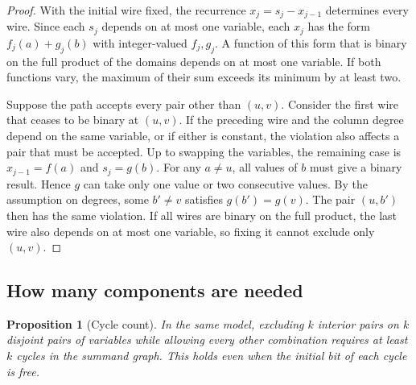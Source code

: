 \documentclass[11pt,a4paper]{article}
\numberwithin{equation}{section}
\newtheorem{proposition}[lemma]{Proposition}
\begin{document}
\begin{proof}
With the initial wire fixed, the recurrence \(x_j=s_j-x_{j-1}\) determines every wire. Since each \(s_j\) depends on at most one variable, each \(x_j\) has the form \(f_j(a)+g_j(b)\) with integer-valued \(f_j,g_j\). A function of this form that is binary on the full product of the domains depends on at most one variable. If both functions vary, the maximum of their sum exceeds its minimum by at least two.

Suppose the path accepts every pair other than \((u,v)\). Consider the first wire that ceases to be binary at \((u,v)\). If the preceding wire and the column degree depend on the same variable, or if either is constant, the violation also affects a pair that must be accepted. Up to swapping the variables, the remaining case is \(x_{j-1}=f(a)\) and \(s_j=g(b)\). For any \(a\ne u\), all values of \(b\) must give a binary result. Hence \(g\) can take only one value or two consecutive values. By the assumption on degrees, some \(b'\ne v\) satisfies \(g(b')=g(v)\). The pair \((u,b')\) then has the same violation. If all wires are binary on the full product, the last wire also depends on at most one variable, so fixing it cannot exclude only \((u,v)\).
\end{proof}

\subsection{How many components are needed}\label{how-many-components-are-needed}

\begin{proposition}[Cycle count]\label{prop:cycle-count}
In the same model, excluding \(k\) interior pairs on \(k\) disjoint pairs of variables while allowing every other combination requires at least \(k\) cycles in the summand graph. This holds even when the initial bit of each cycle is free.
\end{proposition}
\end{document}
